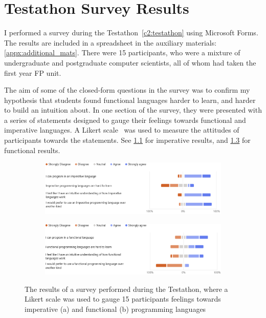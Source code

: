 \chapter{Testathon Survey Results}
\label{appx:Testathon}
I performed a survey during the Testathon~\ref{c2:testathon} using Microsoft Forms. The results are included in a spreadsheet in the auxiliary materials: \ref{appx:additional_mats}. There were 15 participants, who were a mixture of undergraduate and postgraduate computer scientists, all of whom had taken the first year \ac{FP} unit. 

The aim of some of the closed-form questions in the survey was to confirm my hypothesis that students found functional languages harder to learn, and harder to build an intuition about. In one section of the survey, they were presented with a series of statements designed to gauge their feelings towards functional and imperative languages. A Likert scale~\cite{likert1932technique} was used to measure the attitudes of participants towards the statements. See \ref{fig:imp_is_easy} for imperative results, and \ref{fig:fp_is_hard} for functional results. 

\begin{figure}[ht]
    \begin{subfigure}{\textwidth}
        \centering
        \includegraphics[width=\linewidth]{images/imperative_likert.png}
        \caption{}
        \label{fig:imp_is_easy}
    \end{subfigure}
    
    \begin{subfigure}{\textwidth}
        \centering
        \includegraphics[width=\linewidth]{images/fp_likert.png}
        \caption{}
        \label{fig:fp_is_hard}
    \end{subfigure}
    \caption{The results of a survey performed during the Testathon, where a Likert scale was used to gauge 15 participants feelings towards imperative (a) and functional (b) programming languages}
\end{figure}

